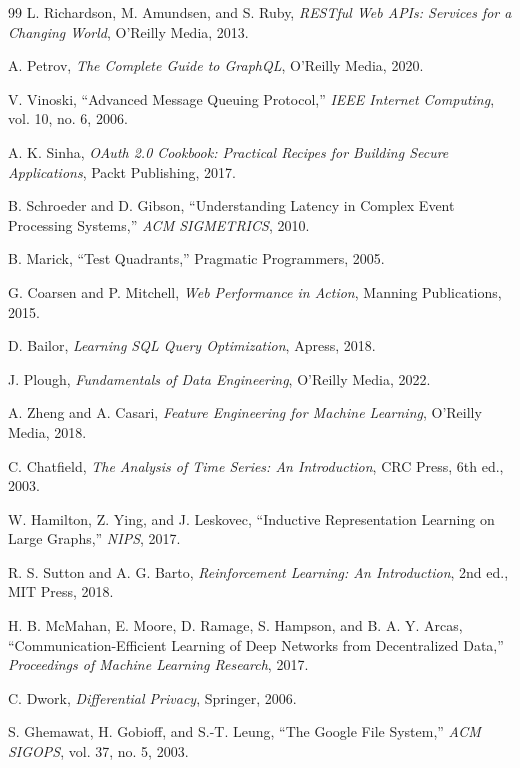 \documentclass[12pt,a4paper]{report}
\begin{document}
\begin{itemize}
\begin{thebibliography}{99}
 L. Richardson, M. Amundsen, and S. Ruby, \textit{RESTful Web APIs: Services for a Changing World}, O'Reilly Media, 2013.

 A. Petrov, \textit{The Complete Guide to GraphQL}, O'Reilly Media, 2020.

 V. Vinoski, ``Advanced Message Queuing Protocol,'' \textit{IEEE Internet Computing}, vol. 10, no. 6, 2006.

 A. K. Sinha, \textit{OAuth 2.0 Cookbook: Practical Recipes for Building Secure Applications}, Packt Publishing, 2017.

 B. Schroeder and D. Gibson, ``Understanding Latency in Complex Event Processing Systems,'' \textit{ACM SIGMETRICS}, 2010.

 B. Marick, ``Test Quadrants,'' Pragmatic Programmers, 2005.

 G. Coarsen and P. Mitchell, \textit{Web Performance in Action}, Manning Publications, 2015.

 D. Bailor, \textit{Learning SQL Query Optimization}, Apress, 2018.

 J. Plough, \textit{Fundamentals of Data Engineering}, O'Reilly Media, 2022.

 A. Zheng and A. Casari, \textit{Feature Engineering for Machine Learning}, O'Reilly Media, 2018.

 C. Chatfield, \textit{The Analysis of Time Series: An Introduction}, CRC Press, 6th ed., 2003.

 W. Hamilton, Z. Ying, and J. Leskovec, ``Inductive Representation Learning on Large Graphs,'' \textit{NIPS}, 2017.

 R. S. Sutton and A. G. Barto, \textit{Reinforcement Learning: An Introduction}, 2nd ed., MIT Press, 2018.

 H. B. McMahan, E. Moore, D. Ramage, S. Hampson, and B. A. Y. Arcas, ``Communication-Efficient Learning of Deep Networks from Decentralized Data,'' \textit{Proceedings of Machine Learning Research}, 2017.

 C. Dwork, \textit{Differential Privacy}, Springer, 2006.

 S. Ghemawat, H. Gobioff, and S.-T. Leung, ``The Google File System,'' \textit{ACM SIGOPS}, vol. 37, no. 5, 2003.


\end{thebibliography}
\end{itemize}
\end{document}
